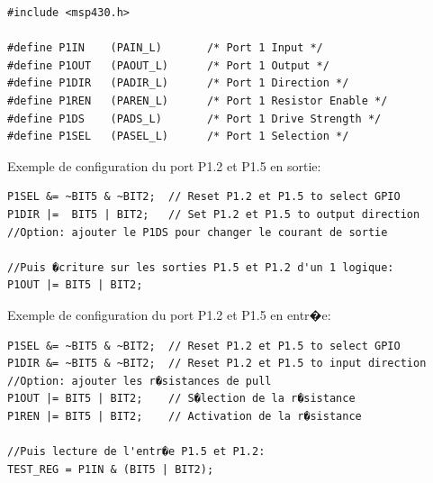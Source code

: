 \lstset{style=customc}
\begin{lstlisting}
#include <msp430.h>

#define P1IN   	(PAIN_L)       /* Port 1 Input */
#define P1OUT 	(PAOUT_L)      /* Port 1 Output */
#define P1DIR	(PADIR_L)      /* Port 1 Direction */
#define P1REN	(PAREN_L)      /* Port 1 Resistor Enable */
#define P1DS 	(PADS_L)       /* Port 1 Drive Strength */
#define P1SEL	(PASEL_L)      /* Port 1 Selection */
\end{lstlisting}

Exemple de configuration du port P1.2 et P1.5 en sortie:

\lstset{style=customc}
\begin{lstlisting}
P1SEL &= ~BIT5 & ~BIT2;  // Reset P1.2 et P1.5 to select GPIO
P1DIR |=  BIT5 | BIT2;   // Set P1.2 et P1.5 to output direction
//Option: ajouter le P1DS pour changer le courant de sortie

//Puis �criture sur les sorties P1.5 et P1.2 d'un 1 logique:
P1OUT |= BIT5 | BIT2;
\end{lstlisting}

Exemple de configuration du port P1.2 et P1.5 en entr�e:

\lstset{style=customc}
\begin{lstlisting}
P1SEL &= ~BIT5 & ~BIT2;  // Reset P1.2 et P1.5 to select GPIO
P1DIR &= ~BIT5 & ~BIT2;  // Reset P1.2 et P1.5 to input direction
//Option: ajouter les r�sistances de pull
P1OUT |= BIT5 | BIT2;    // S�lection de la r�sistance
P1REN |= BIT5 | BIT2;    // Activation de la r�sistance

//Puis lecture de l'entr�e P1.5 et P1.2:
TEST_REG = P1IN & (BIT5 | BIT2);
\end{lstlisting}

